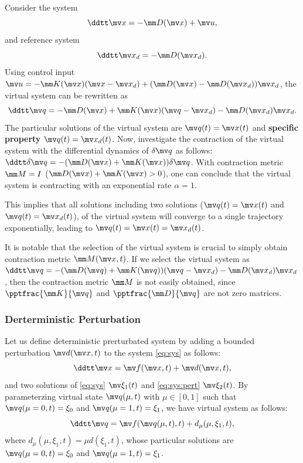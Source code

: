 \begin{example}
    Consider the system 
    \begin{equation}
        \ddtt \bdx = -\mm D(\bdx) + \bdu,
    \end{equation}
    and reference system 
    \begin{equation}
        \ddtt \bdx_d = -\mm D(\bdx_d).
    \end{equation}
    Using control input $\bdu = -\mm K(\bdx)(\bdx-\bdx_d)+(\mm D(\bdx)-\mm D(\bdx_d))\bdx_d$, the virtual system can be rewritten as
    \begin{equation}
        \ddtt\bdq=-\mm D(\bdx)+\mm K(\bdx)(\bdq-\bdx_d)-\mm D(\bdx_d)\bdx_d
        .
    \end{equation}
    The particular solutions of the virtual system are $\bdq(t)=\bdx(t)$ and \textbf{specific property} $\bdq(t)=\bdx_d(t)$.
    Now, investigate the contraction of the virtual system with the differential dynamics of $\delta\bdq$ as follows: $\ddtt\delta\bdq=-(\mm D(\bdx)+\mm K(\bdx))\delta\bdq$.
    With contraction metric $\mm M=I$ (\ie $\mm D(\bdx)+\mm K(\bdx)>0$), one can conclude that the virtual system is contracting with an exponential rate $\alpha=1$.

    This implies that all solutions including two solutions (\ie $\bdq(t)=\bdx(t)$ and $\bdq(t)=\bdx_d(t)$), of the virtual system will converge to a single trajectory exponentially, leading to $\bdq(t)=\bdx(t)=\bdx_d(t)$.
    
    It is notable that the selection of the virtual system is crucial to simply obtain contraction metric $\mm M(\bdx,t)$.
    If we select the virtual system as $\ddtt \bdq = -(\mm D(\bdq)+\mm K(\bdq))(\bdq-\bdx_d)-\mm D(\bdx_d)\bdx_d$, then the contraction metric $\mm M$ is not easily obtained, since $\pptfrac{\mm K}{\bdq}$ and $\pptfrac{\mm D}{\bdq}$ are not zero matrices.
\end{example}
    
\subsubsection{Derterministic Perturbation}

Let us define deterministic prerturbated system by adding a bounded perturbation $\bdd(\bdx,t)$ to the system \eqref{eq:sys} as follows:
\begin{equation}
    \ddtt\bdx
    =
    \bdf(\bdx,t)
    +
    \bdd(\bdx,t)
    ,
    \label{eq:sys:pert}
\end{equation}
and two solutions of \eqref{eq:sys} $\mv\xi_1(t)$ and \eqref{eq:sys:pert} $\mv\xi_2(t)$.
By parameterzing virtual state $\bdq(\mu,t)$ with $\mu\in[0,1]$ such that $\bdq(\mu=0,t)=\xi_0$ and $\bdq(\mu=1,t)=\xi_1$, we have virtual system as follows:
\begin{equation}
    \ddtt\bdq = \bdf(\bdq(\mu,t),t)+d_\mu(\mu,\xi_1,t)
    ,
    \label{eq:sys:pert:virtual}
\end{equation}
where $d_\mu(\mu,\xi_1,t)=\mu d(\xi_1,t)$, whose particular solutions are $\bdq(\mu=0,t)=\xi_0$ and $\bdq(\mu=1,t)=\xi_1$.


